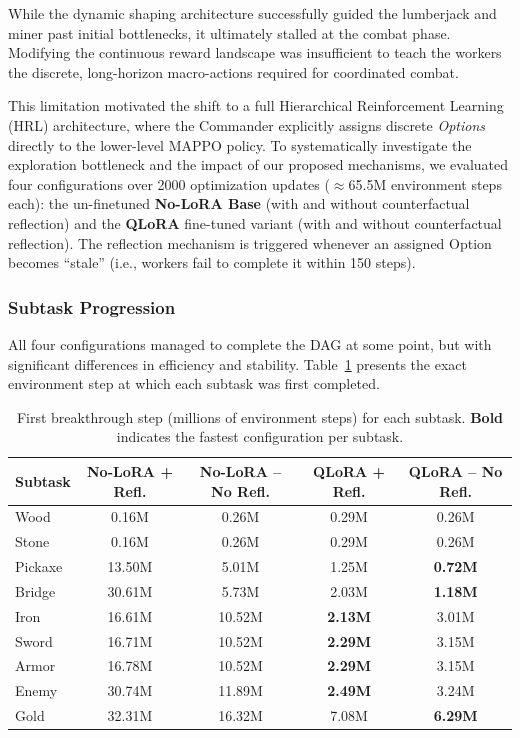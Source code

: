 While the dynamic shaping architecture successfully guided the lumberjack and miner past initial bottlenecks, it ultimately stalled at the combat phase. Modifying the continuous reward landscape was insufficient to teach the workers the discrete, long-horizon macro-actions required for coordinated combat.

This limitation motivated the shift to a full Hierarchical Reinforcement Learning (HRL) architecture, where the Commander explicitly assigns discrete \emph{Options} directly to the lower-level MAPPO policy. To systematically investigate the exploration bottleneck and the impact of our proposed mechanisms, we evaluated four configurations over 2000 optimization updates ($\approx$65.5M environment steps each): the un-finetuned \textbf{No-LoRA Base} (with and without counterfactual reflection) and the \textbf{QLoRA} fine-tuned variant (with and without counterfactual reflection). The reflection mechanism is triggered whenever an assigned Option becomes ``stale'' (i.e., workers fail to complete it within 150 steps).

\subsubsection{Subtask Progression}

All four configurations managed to complete the DAG at some point, but with significant differences in efficiency and stability. Table~\ref{tab:hrl_breakthrough} presents the exact environment step at which each subtask was first completed. 

\begin{table}[H]
\centering
\caption[First Breakthrough Step per Subtask]{First breakthrough step (millions of environment steps) for each subtask. \textbf{Bold} indicates the fastest configuration per subtask.}
\label{tab:hrl_breakthrough}
\begin{tabular}{lcccc}
\hline
\textbf{Subtask} & \textbf{No-LoRA + Refl.} & \textbf{No-LoRA -- No Refl.} & \textbf{QLoRA + Refl.} & \textbf{QLoRA -- No Refl.} \\
\hline
Wood       & 0.16M & 0.26M & 0.29M & 0.26M \\
Stone      & 0.16M & 0.26M & 0.29M & 0.26M \\
Pickaxe    & 13.50M & 5.01M & 1.25M & \textbf{0.72M} \\
Bridge     & 30.61M & 5.73M & 2.03M & \textbf{1.18M} \\
Iron       & 16.61M & 10.52M & \textbf{2.13M} & 3.01M \\
Sword      & 16.71M & 10.52M & \textbf{2.29M} & 3.15M \\
Armor      & 16.78M & 10.52M & \textbf{2.29M} & 3.15M \\
Enemy      & 30.74M & 11.89M & \textbf{2.49M} & 3.24M \\
Gold       & 32.31M & 16.32M & 7.08M & \textbf{6.29M} \\
\hline
\end{tabular}
\end{table}


